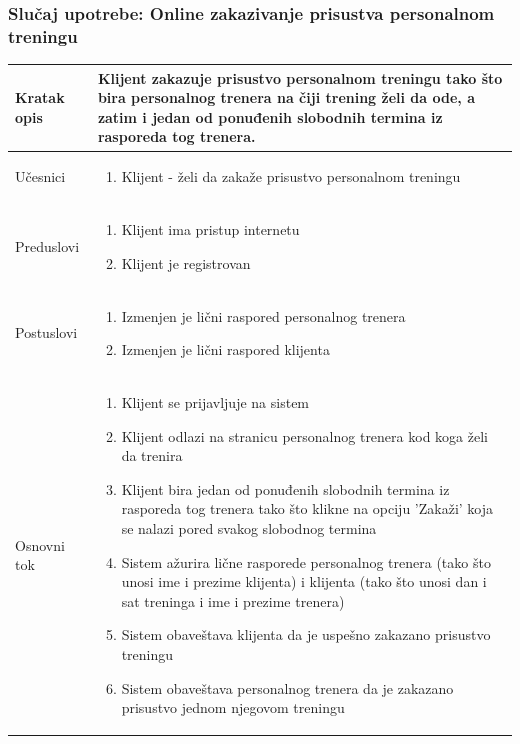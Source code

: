 \subsubsection{Slučaj upotrebe: Online zakazivanje prisustva personalnom treningu}



\begin{longtable}{| p{} | p{} |} 
\hline
    Kratak opis & Klijent zakazuje prisustvo personalnom treningu tako što bira personalnog trenera na čiji trening želi da ode, a zatim i jedan od ponuđenih slobodnih termina iz rasporeda tog trenera. \\ 
\hline    
    Učesnici & 
    \begin{enumerate}
    \item  Klijent - želi da zakaže prisustvo personalnom treningu
    \end{enumerate}\\
\hline
   Preduslovi & 
   \begin{enumerate}
    \item Klijent ima pristup internetu
    \item Klijent je registrovan
   \end{enumerate} \\
\hline  
    Postuslovi & 
    \begin{enumerate}
    \item Izmenjen je lični raspored personalnog trenera
    \item Izmenjen je lični raspored klijenta
   \end{enumerate} \\
\hline
    Osnovni tok &
    \begin{enumerate}
   \item Klijent se prijavljuje na sistem
    \item Klijent odlazi na stranicu personalnog trenera kod koga želi da trenira
    \item Klijent bira jedan od ponuđenih slobodnih termina iz rasporeda tog trenera tako što klikne na opciju 'Zakaži' koja se nalazi pored svakog slobodnog termina
    \item Sistem ažurira lične rasporede personalnog trenera (tako što unosi ime i prezime klijenta) i klijenta (tako što unosi dan i sat treninga i ime i prezime trenera)
    \item Sistem obaveštava klijenta da je uspešno zakazano prisustvo treningu
    \item Sistem obaveštava personalnog trenera da je zakazano prisustvo jednom njegovom treningu

\end{enumerate}
\end{longtable}
